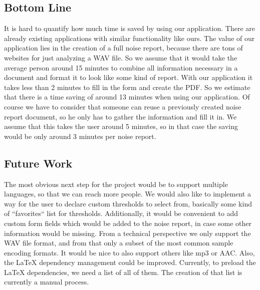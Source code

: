 \subsection{Bottom Line}
It is hard to quantify how much time is saved by using our application.
There are already existing applications with similar functionality like ours.
The value of our application lies in the creation of a full noise report, because there are tons of websites for just analyzing a WAV file.
So we assume that it would take the average person around 15 minutes to combine all information necessary in a document and format it to look like some kind of report.
With our application it takes less than 2 minutes to fill in the form and create the PDF. So we estimate that there is a time saving of around 13 minutes when using our application. Of course we have to consider that someone can reuse a previously created noise report document, so he only has to gather the information and fill it in. We assume that this takes the user around 5 minutes, so in that case the saving would be only around 3 minutes per noise report.

\subsection{Future Work}
The most obvious next step for the project would be to support multiple languages, so that we can reach more people. We would also like to implement a way
for the user to declare custom thresholds to select from, basically some kind of ``favorites`` list for thresholds. Additionally, it would be convenient to add
custom form fields which would be added to the noise report, in case some other information would be missing. From a technical perspective we only support the WAV
file format, and from that only a subset of the most common sample encoding formats. It would be nice to also support others like mp3 or AAC. Also, the LaTeX dependency
management could be improved. Currently, to preload the LaTeX dependencies, we need a list of all of them. The creation of that list is currently a manual process.
